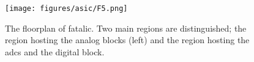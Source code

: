 \begin{figure}[tb]
\bigskip
\centering
  \texttt{[image: figures/asic/F5.png]}
  \caption{The floorplan of \gls{fatalic}. Two main regions are distinguished; the region hosting the analog blocks
  (left) and the region hosting the \glspl{adc} and the digital block.\label{fig:fatalic_floor}}
\end{figure}

